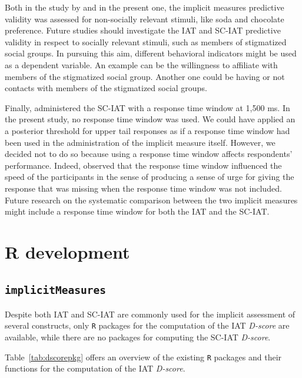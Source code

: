 \documentclass[12pt]{book}
\begin{document}
Both in the study by  and in the present one, the implicit measures predictive validity was assessed for non-socially relevant stimuli, like soda and chocolate preference. Future studies should investigate the IAT and SC-IAT predictive validity in respect to socially relevant stimuli, such as members of stigmatized social groups. In pursuing this aim, different behavioral indicators might be used as a dependent variable. An example can be the willingness to affiliate with members of the stigmatized social group. Another one could be having or not contacts with members of the stigmatized social groups.

Finally,  administered the SC-IAT with a response time window at 1,500 ms. In the present study, no response time window was used. We could have applied an a posterior threshold for upper tail responses as if a response time window had been used in the administration of the implicit measure itself. However, we decided not to do so because using a response time window affects respondents’ performance. Indeed,  observed that the response time window influenced the speed of the participants in the sense of producing a sense of urge for giving the response that was missing when the response time window was not included. Future research on the systematic comparison between the two implicit measures might include a response time window for both the IAT and the SC-IAT.

\newpage
\section{R development}
\subsection{\texttt{implicitMeasures}}\label{sub:package}

Despite both IAT and SC-IAT are commonly used for the implicit assessment of several constructs, only \texttt{R} packages for the computation of the IAT \emph{D-score} are available, while there are no packages for computing the SC-IAT \emph{D-score}.

Table~\ref{tab:dscorepkg} offers an overview of the existing \texttt{R} packages and their functions for the computation of the IAT \emph{D-score}.
\end{document}
